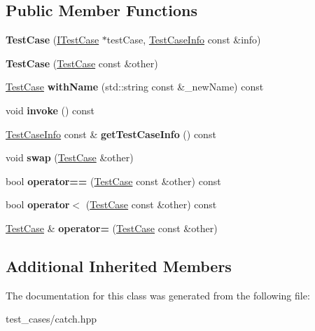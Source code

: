 \subsection*{Public Member Functions}
\begin{DoxyCompactItemize}
\item 
\mbox{\label{classCatch_1_1TestCase_a03a5b913484681bd6d398dc5e9c2a907}} 
{\bfseries Test\+Case} (\hyperlink{structCatch_1_1ITestCase}{I\+Test\+Case} $\ast$test\+Case, \hyperlink{structCatch_1_1TestCaseInfo}{Test\+Case\+Info} const \&info)
\item 
\mbox{\label{classCatch_1_1TestCase_ac0011d3789edc3e44edb41f13c4775a0}} 
{\bfseries Test\+Case} (\hyperlink{classCatch_1_1TestCase}{Test\+Case} const \&other)
\item 
\mbox{\label{classCatch_1_1TestCase_a0812e8a216d09b087d5874687009f0d6}} 
\hyperlink{classCatch_1_1TestCase}{Test\+Case} {\bfseries with\+Name} (std\+::string const \&\+\_\+new\+Name) const
\item 
\mbox{\label{classCatch_1_1TestCase_a26f346c8446dded0562fe3818ae71651}} 
void {\bfseries invoke} () const
\item 
\mbox{\label{classCatch_1_1TestCase_a1ea0d79f49156cebea076fe1ba50d2b6}} 
\hyperlink{structCatch_1_1TestCaseInfo}{Test\+Case\+Info} const  \& {\bfseries get\+Test\+Case\+Info} () const
\item 
\mbox{\label{classCatch_1_1TestCase_aee38f908faf10b905b209ca388275413}} 
void {\bfseries swap} (\hyperlink{classCatch_1_1TestCase}{Test\+Case} \&other)
\item 
\mbox{\label{classCatch_1_1TestCase_a5456d03a90f75292835c158f3a3374a1}} 
bool {\bfseries operator==} (\hyperlink{classCatch_1_1TestCase}{Test\+Case} const \&other) const
\item 
\mbox{\label{classCatch_1_1TestCase_a030e4b9282e9b32e08c8bd5e5cd6fa98}} 
bool {\bfseries operator$<$} (\hyperlink{classCatch_1_1TestCase}{Test\+Case} const \&other) const
\item 
\mbox{\label{classCatch_1_1TestCase_a8022e3f74232f7887d2d2cbbc8876502}} 
\hyperlink{classCatch_1_1TestCase}{Test\+Case} \& {\bfseries operator=} (\hyperlink{classCatch_1_1TestCase}{Test\+Case} const \&other)
\end{DoxyCompactItemize}
\subsection*{Additional Inherited Members}


The documentation for this class was generated from the following file\+:\begin{DoxyCompactItemize}
\item 
test\+\_\+cases/catch.\+hpp\end{DoxyCompactItemize}
